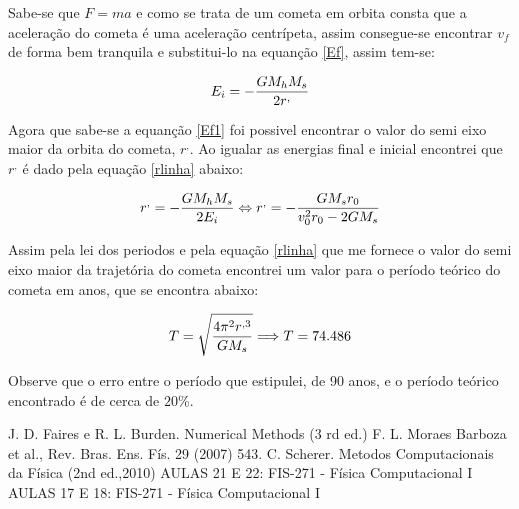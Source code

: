 \documentclass[a4wide]{report}
\begin{document}
Sabe-se que $F = ma $ e como se trata de um cometa em orbita consta que a aceleração do cometa é uma aceleração centrípeta, assim consegue-se encontrar
$v_{f}$ de forma bem tranquila e substitui-lo na equanção \ref{Ef}, assim tem-se:

\begin{equation}
\centering
E_{i} =  - \frac{GM_{h}M_{s}}{2r^{,}}
\label{Ef1}
\end{equation}

Agora que sabe-se a equanção \ref{Ef1} foi possivel encontrar o valor do semi eixo maior da orbita do cometa, $r^{,}$. 
Ao igualar as energias final e inicial encontrei que $r^{,}$ é dado pela equação \ref{rlinha} abaixo:

\begin{equation}
\centering
r^{,} =  - \frac{GM_{h}M_{s}}{2E_{i}} \Leftrightarrow r^{,} =  - \frac{GM_{s}r_{0}}{v_{0}^{2}r_{0} - 2GM_{s} }
\label{rlinha}
\end{equation}

Assim pela lei dos periodos e pela equação \ref{rlinha} que me fornece o valor do semi eixo maior da trajetória do cometa encontrei 
um valor para o período teórico do cometa em anos, que se encontra abaixo:

\begin{equation}
\centering
T = \sqrt{\frac{4\pi^{2}r^{,3}}{GM_{s}} } \Longrightarrow T = 74.486 
\label{periodoteorico}
\end{equation}

Observe que o erro entre o período que estipulei, de 90 anos, e o período teórico encontrado é de cerca de $20\%$.

\begin{thebibliography}{99}

 J. D. Faires e R. L. Burden. Numerical Methods (3 rd ed.) 
 F. L. Moraes Barboza et al., Rev. Bras. Ens. Fís. 29 (2007) 543.
 C. Scherer. Metodos Computacionais da Física (2nd ed.,2010)
 AULAS 21 E 22: FIS-271 - Física Computacional I
 AULAS 17 E 18: FIS-271 - Física Computacional I
\end{thebibliography}
\end{document}
